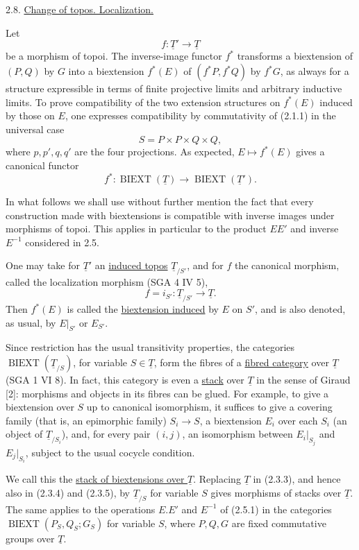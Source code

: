 
2.8. \underline{Change of topos. Localization.}

Let
\[
 f:\underline T'\longrightarrow\underline T
\]
be a morphism of topoi. The inverse-image functor $f^*$ transforms a
biextension of $(P,Q)$ by $G$ into a biextension $f^*(E)$ of
$(f^*P,f^*Q)$ by $f^*G$, as always for a structure expressible in
terms of finite projective limits and arbitrary inductive limits. To
prove compatibility of the two extension structures on $f^*(E)$
induced by those on $E$, one expresses compatibility by commutativity
of (2.1.1) in the universal case
\[
 S=P\times P\times Q\times Q,
\]
where $p,p',q,q'$ are the four projections. As expected,
$E\mapsto f^*(E)$ gives a canonical functor
\[
 f^*:\operatorname{BIEXT}(\underline T)
 \longrightarrow
 \operatorname{BIEXT}(\underline T').
\]

In what follows we shall use without further mention the fact that
every construction made with biextensions is compatible with inverse
images under morphisms of topoi. This applies in particular to the
product $EE'$ and inverse $E^{-1}$ considered in 2.5.

One may take for $\underline T'$ an \underline{induced topos}
$\underline T_{/S'}$, and for $f$ the canonical morphism, called the
localization morphism (SGA 4 IV 5),
\[
 f=i_{S'}:\underline T_{/S'}\longrightarrow\underline T.
\]
Then $f^*(E)$ is called the \underline{biextension induced} by $E$ on
$S'$, and is also denoted, as usual, by $E|_{S'}$ or $E_{S'}$.

Since restriction has the usual transitivity properties, the
categories $\operatorname{BIEXT}(\underline T_{/S})$, for variable
$S\in\underline T$, form the fibres of a \underline{fibred category}
over $\underline T$ (SGA 1 VI 8). In fact, this category is even a
\underline{stack} over $\underline T$ in the sense of Giraud [2]:
morphisms and objects in its fibres can be glued. For example, to give
a biextension over $S$ up to canonical isomorphism, it suffices to give
a covering family (that is, an epimorphic family) $S_i\longrightarrow
S$, a biextension $E_i$ over each $S_i$ (an object of
$\underline T_{/S_i}$), and, for every pair $(i,j)$, an isomorphism
between $E_i|_{S_j}$ and $E_j|_{S_i}$, subject to the usual cocycle
condition.

We call this the \underline{stack of biextensions over $\underline T$}.
Replacing $\underline T$ in (2.3.3), and hence also in (2.3.4) and
(2.3.5), by $\underline T_{/S}$ for variable $S$ gives morphisms of
stacks over $\underline T$. The same applies to the operations $E.E'$
and $E^{-1}$ of (2.5.1) in the categories
$\operatorname{BIEXT}(P_S,Q_S;G_S)$ for variable $S$, where $P,Q,G$
are fixed commutative groups over $\underline T$.

